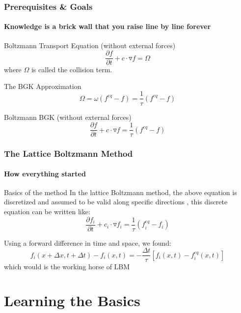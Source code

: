 \documentclass[12pt]{beamer}
\begin{document}
\begin{frame}
  \frametitle{Prerequisites \& Goals}
  \framesubtitle{Knowledge is a brick wall that you raise line by line forever}
  \begin{block}{Boltzmann Transport Equation (without external forces)}
  \begin{equation}
   \frac{\partial f}{\partial t}+c\cdot \triangledown f =\Omega
  \end{equation}
  where $\Omega$ is called the collision term.
  \end{block}

  \begin{block}{The BGK Approximation}
  \begin{equation}
   \Omega = \omega(f^{eq}-f) = \frac{1}{\tau}(f^{eq}-f)
  \end{equation}
  \end{block}

  \begin{block}{Boltzmann BGK (without external forces)}
  \begin{equation}
   \frac{\partial f}{\partial t}+c\cdot \triangledown f = \frac{1}{\tau}(f^{eq}-f)
  \end{equation}
  \end{block}
\end{frame}

\begin{frame}
  \frametitle{The Lattice Boltzmann Method}
  \framesubtitle{How everything started}
  \begin{block}{Basics of the method}
  In the lattice Boltzmann method, the above equation is discretized and assumed to be valid 
  along specific directions , this discrete equation can be written like:
  \begin{equation}
   \frac{\partial f_i}{\partial t}+c_i\cdot \triangledown f_i = \frac{1}{\tau}(f_i^{eq}-f_i)
  \end{equation}
  \end{block}
  Using a forward difference in time and space, we found:
  \begin{equation}
    f_i(x+\Delta x,t+\Delta t)-f_i(x,t)=-\frac{\Delta t}{\tau}[f_i(x,t)-f_i^{eq}(x,t)] 
  \end{equation}
  which would is the working horse of LBM
\end{frame}

\section{Learning the Basics}
\end{document}
